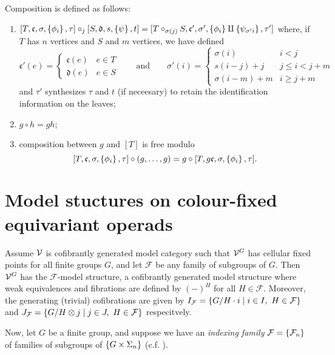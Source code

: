 \documentclass[psamsfonts,oneside,10pt,letterpaper
,draft
]{amsart}%
\renewcommand{\fc}{\ensuremath{\mathfrak{c}}}
\renewcommand{\F}{\mathcal F}
\renewcommand{\1}{\ensuremath{\mathbb{id}}}
\begin{document}
Composition is defined as follows:
\begin{enumerate}
\item $[T,\fc,\sigma,\set{\phi_i},\tau] \circ_j [S,\mathfrak{d}, s, \set{\psi}, t] = [T\circ_{\sigma(j)}S, \fc', \sigma', \set{\phi_i}\amalg\set{\psi_{\sigma' i}}, \tau']$ where, if $T$ has $n$ vertices and $S$ and $m$ vertices, we have defined
      \[
            \fc'(e) = \begin{cases}\fc(e) & e\in T\\ \mathfrak{d}(e) & e\in S\end{cases} \qquad \mbox{and} \qquad 
            \sigma'(i) =
            \begin{cases}
                  \sigma(i) & i< j\\
                  s(i-j)+j & j\leq i < j+m\\
                  \sigma(i-m)+m & i\geq j+m
            \end{cases}
      \]
      and $\tau'$ synthesizes $\tau$ and $t$ (if neceesary) to retain the identification information on the leaves;
\item $g\circ h = gh$;
\item composition between $g$ and $[T]$ is free modulo
      \[
            [T,\fc,\sigma,\set{\phi_i},\tau] \circ (g,\ldots,g) = g\circ [T,g\fc,\sigma,\set{\phi_i}, \tau].
      \]
\end{enumerate}

\newpage
\section{Model stuctures on colour-fixed equivariant operads}


\begin{proposition}
      Assume $\mathcal V$ is cofibrantly generated model category such that $\mathcal V^G$ has cellular fixed points for all finite groups $G$,
      and let $\F$ be any family of subgroups of $G$.
      Then $\mathcal V^G$ has the $\F$-model structure, a cofibrantly generated model structure where
      weak equivalences and fibrations are defined by $(-)^H$ for all $H\in \F$.
      Moreover, the generating (trivial) cofibrations are given by
      $I_\F = \sets{G/H \cdot i}{i\in I,\ H\in \F}$ and
      $J_\F = \sets{G/H\otimes j}{j\in J,\ H\in \F}$ respecitvely. 
\end{proposition}

Now, let $G$ be a finite group, and suppose we have an {\em indexing family} $\F = \set{\F_n}$ of families of subgroups of $\left\{G\times \Sigma_n\right\}$ (c.f. \cite{BH15}). 
\end{document}
